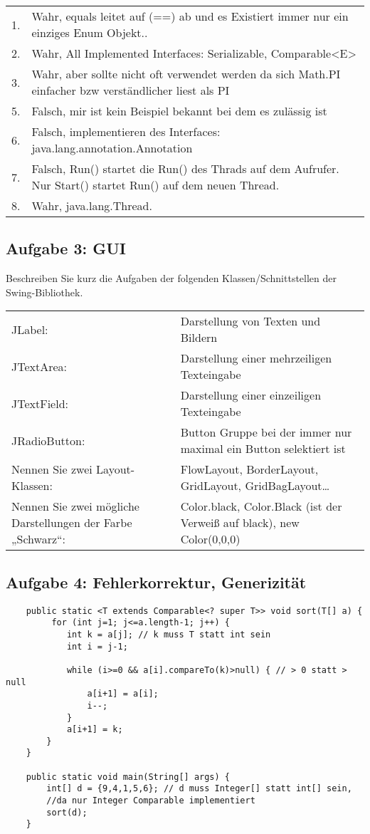 \documentclass[a4paper, 10pt]{article}
\begin{document}
\begin{tabular}{lp{15cm}} 
1.& Wahr, equals leitet auf (==) ab und es Existiert immer nur ein einziges Enum Objekt..\\
2.& Wahr, All Implemented Interfaces: Serializable, Comparable<E>\\
3.& Wahr, aber sollte nicht oft verwendet werden da sich Math.PI einfacher bzw verständlicher liest als PI\\
5.& Falsch, mir ist kein Beispiel bekannt bei dem es zulässig ist\\
6.& Falsch, implementieren des Interfaces: java.lang.annotation.Annotation\\
7.& Falsch, Run() startet die Run() des Thrads auf dem Aufrufer. Nur Start() startet Run() auf dem neuen Thread.\\
8.& Wahr, java.lang.Thread.  
\end{tabular}

\subsection*{Aufgabe 3: GUI}
Beschreiben Sie kurz die Aufgaben der folgenden
Klassen/Schnittstellen der Swing-Bibliothek.\\

\begin{tabular}{p{5cm}p{15cm}}
JLabel: & Darstellung von Texten und Bildern \\
JTextArea: & Darstellung einer mehrzeiligen Texteingabe\\
JTextField: & Darstellung einer einzeiligen Texteingabe\\
JRadioButton: & Button Gruppe bei der immer nur maximal ein Button selektiert ist\\
Nennen Sie zwei Layout-Klassen: & FlowLayout, BorderLayout, GridLayout, GridBagLayout\ldots\\
Nennen Sie zwei mögliche Darstellungen der Farbe „Schwarz“: & Color.black, Color.Black (ist der Verweiß auf black), new Color(0,0,0)
\end{tabular}

\subsection*{Aufgabe 4: Fehlerkorrektur, Generizität}

\begin{lstlisting}
    public static <T extends Comparable<? super T>> void sort(T[] a) {
         for (int j=1; j<=a.length-1; j++) {
         	int k = a[j]; // k muss T statt int sein
         	int i = j-1;
         	
         	while (i>=0 && a[i].compareTo(k)>null) { // > 0 statt > null
         		a[i+1] = a[i];
         		i--;
         	}
         	a[i+1] = k;
        }
    }
    
    public static void main(String[] args) {
        int[] d = {9,4,1,5,6}; // d muss Integer[] statt int[] sein, 
        //da nur Integer Comparable implementiert
        sort(d);
    }
\end{lstlisting}
\end{document}
